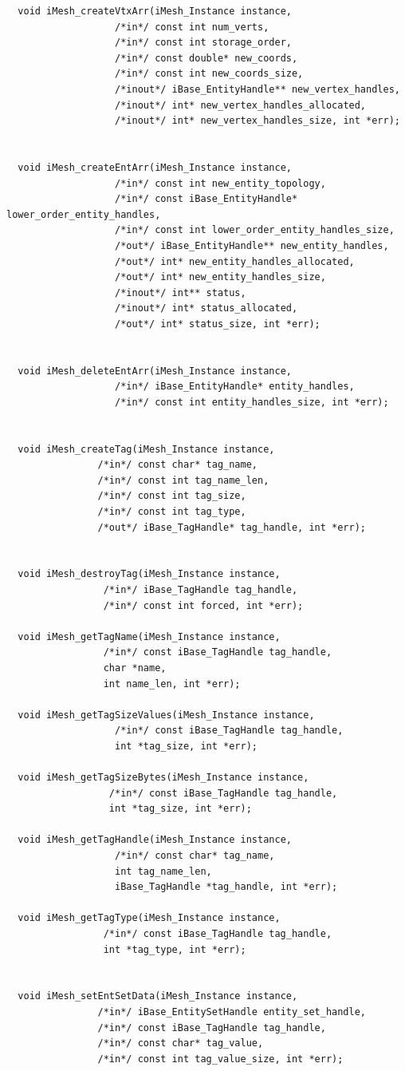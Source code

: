 \documentclass{article}
\begin{document}
\begin{small}
\begin{verbatim}
  void iMesh_createVtxArr(iMesh_Instance instance,
			       /*in*/ const int num_verts,
			       /*in*/ const int storage_order,
			       /*in*/ const double* new_coords,
			       /*in*/ const int new_coords_size,
			       /*inout*/ iBase_EntityHandle** new_vertex_handles,
			       /*inout*/ int* new_vertex_handles_allocated,
			       /*inout*/ int* new_vertex_handles_size, int *err);


  void iMesh_createEntArr(iMesh_Instance instance,
			       /*in*/ const int new_entity_topology,
			       /*in*/ const iBase_EntityHandle* lower_order_entity_handles,
			       /*in*/ const int lower_order_entity_handles_size,
			       /*out*/ iBase_EntityHandle** new_entity_handles,
			       /*out*/ int* new_entity_handles_allocated,
			       /*out*/ int* new_entity_handles_size,
			       /*inout*/ int** status,
			       /*inout*/ int* status_allocated,
			       /*out*/ int* status_size, int *err);


  void iMesh_deleteEntArr(iMesh_Instance instance,
			       /*in*/ iBase_EntityHandle* entity_handles,
			       /*in*/ const int entity_handles_size, int *err);


  void iMesh_createTag(iMesh_Instance instance,
			    /*in*/ const char* tag_name,
			    /*in*/ const int tag_name_len,
			    /*in*/ const int tag_size,
			    /*in*/ const int tag_type,
			    /*out*/ iBase_TagHandle* tag_handle, int *err);


  void iMesh_destroyTag(iMesh_Instance instance,
			     /*in*/ iBase_TagHandle tag_handle,
			     /*in*/ const int forced, int *err);

  void iMesh_getTagName(iMesh_Instance instance,
			     /*in*/ const iBase_TagHandle tag_handle,
			     char *name,
			     int name_len, int *err);

  void iMesh_getTagSizeValues(iMesh_Instance instance,
				   /*in*/ const iBase_TagHandle tag_handle,
				   int *tag_size, int *err);

  void iMesh_getTagSizeBytes(iMesh_Instance instance,
				  /*in*/ const iBase_TagHandle tag_handle,
				  int *tag_size, int *err);

  void iMesh_getTagHandle(iMesh_Instance instance,
			       /*in*/ const char* tag_name,
			       int tag_name_len,
			       iBase_TagHandle *tag_handle, int *err);

  void iMesh_getTagType(iMesh_Instance instance,
			     /*in*/ const iBase_TagHandle tag_handle,
			     int *tag_type, int *err);


  void iMesh_setEntSetData(iMesh_Instance instance,
				/*in*/ iBase_EntitySetHandle entity_set_handle,
				/*in*/ const iBase_TagHandle tag_handle,
				/*in*/ const char* tag_value,
				/*in*/ const int tag_value_size, int *err);



\end{verbatim}
\end{small}
\end{document}
